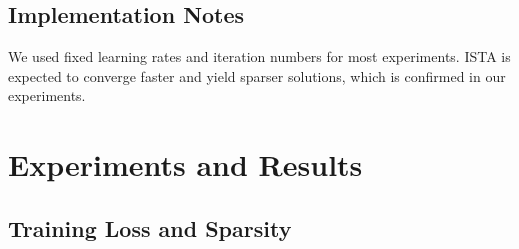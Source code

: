 \documentclass[11pt]{article}
\begin{document}
\subsection*{Implementation Notes}

We used fixed learning rates and iteration numbers for most experiments. ISTA is expected to converge faster and yield sparser solutions, which is confirmed in our experiments.

\section{Experiments and Results}


\subsection{Training Loss and Sparsity}
\end{document}
